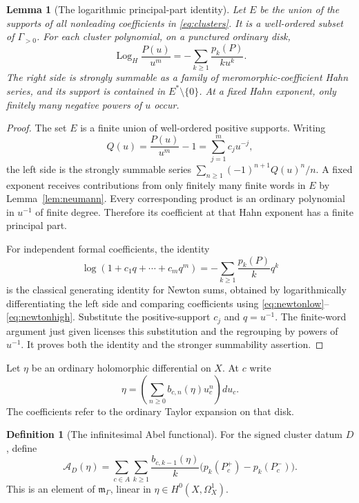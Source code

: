 \documentclass[11pt,letterpaper]{article}
\numberwithin{equation}{section}
\newtheorem{lemma}[theorem]{Lemma}
\theoremstyle{definition}
\newtheorem{definition}[theorem]{Definition}
\theoremstyle{remark}
\newcommand{\mm}{\mathfrak m}
\newcommand{\Log}{\operatorname{Log}_{H}}
\newcommand{\mg}{\mm_\Gamma}
\begin{document}
\begin{lemma}[The logarithmic principal-part identity]
\label{lem:lognewton}
Let $E$ be the union of the supports of all nonleading coefficients in
\eqref{eq:clusters}. It is a well-ordered subset of $\Gamma_{>0}$.
For each cluster polynomial, on a punctured ordinary disk,
\begin{equation}
 \Log\frac{P(u)}{u^m}
   =-\sum_{k\ge1}\frac{p_k(P)}{k u^k}.
 \label{eq:lognewton}
\end{equation}
The right side is strongly summable as a family of
meromorphic-coefficient Hahn series, and its support is contained in
$E^*\setminus\{0\}$. At a fixed Hahn exponent, only finitely many
negative powers of $u$ occur.
\end{lemma}
\begin{proof}
The set $E$ is a finite union of well-ordered positive supports.
Writing
\[
 Q(u)=\frac{P(u)}{u^m}-1=\sum_{j=1}^m c_j u^{-j},
\]
the left side is the strongly summable series
$\sum_{n\ge1}(-1)^{n+1}Q(u)^n/n$. A fixed exponent receives contributions
from only finitely many finite words in $E$ by
Lemma~\ref{lem:neumann}. Every corresponding product is an ordinary
polynomial in $u^{-1}$ of finite degree. Therefore its coefficient at
that Hahn exponent has a finite principal part.

For independent formal coefficients, the identity
\[
 \log(1+c_1q+\cdots+c_mq^m)
          =-\sum_{k\ge1}\frac{p_k(P)}k q^k
\]
is the classical generating identity for Newton sums, obtained by
logarithmically differentiating the left side and comparing
coefficients using \eqref{eq:newtonlow}--\eqref{eq:newtonhigh}.
Substitute the positive-support $c_j$ and $q=u^{-1}$. The finite-word
argument just given licenses this substitution and the regrouping by
powers of $u^{-1}$. It proves both the identity and the stronger
summability assertion.
\end{proof}

Let $\eta$ be an ordinary holomorphic differential on $X$. At $c$ write
\begin{equation}
 \eta=\left(\sum_{n\ge0}b_{c,n}(\eta)u_c^n\right)du_c.
 \label{eq:differential}
\end{equation}
The coefficients refer to the ordinary Taylor expansion on that disk.

\begin{definition}[The infinitesimal Abel functional]
For the signed cluster datum $D$, define
\begin{equation}
 \mathcal A_D(\eta)=
 \sum_{c\in A}\sum_{k\ge1}
 \frac{b_{c,k-1}(\eta)}k
       \bigl(p_k(P_c^+)-p_k(P_c^-)\bigr).
 \label{eq:Abel}
\end{equation}
This is an element of $\mg$, linear in
$\eta\in H^0(X,\Omega_X^1)$.
\end{definition}
\end{document}
